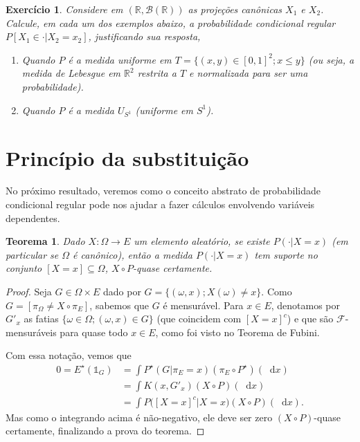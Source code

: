 \documentclass[reqno, final]{book}
\newcommand*\1{\mathds{1}}
\newtheorem{theorem}{Teorema}[section]
\newtheorem{exercise}[example]{Exercício}
\renewcommand*\d{\mathop{}\!\mathrm{d}}
\begin{document}
\begin{exercise}
  Considere em $(\mathbb{R}, \mathcal{B}(\mathbb{R}))$ as projeções canônicas $X_1$ e $X_2$.
  Calcule, em cada um dos exemplos abaixo, a probabilidade condicional regular $P[X_1 \in \cdot|X_2 = x_2]$, justificando sua resposta,
  \begin{enumerate}[\quad a)]
  \item Quando $P$ é a medida uniforme em $T = \{(x,y) \in [0,1]^2; x \leq y\}$ (ou seja, a medida de Lebesgue em $\mathbb{R}^2$ restrita a $T$ e normalizada para ser uma probabilidade).
  \item Quando $P$ é a medida $U_{S^1}$ (uniforme em $S^1$).
  \end{enumerate}
\end{exercise}

\section{Princípio da substituição}

No próximo resultado, veremos como o conceito abstrato de probabilidade condicional regular pode nos ajudar a fazer cálculos envolvendo variáveis dependentes.

\begin{theorem}
  Dado $X: \Omega \to E$ um elemento aleatório, se existe $P(\cdot | X = x)$ (em particular se $\Omega$ é canônico), então a medida $P(\cdot | X = x)$ tem suporte no conjunto $[X = x] \subseteq \Omega$, $X \circ P$-quase certamente.
\end{theorem}

\begin{proof}
  Seja $G \in \Omega \times E$ dado por $G = \{(\omega, x); X(\omega) \neq x\}$.
  Como $G = [\pi_\Omega \neq X \circ \pi_E]$, sabemos que $G$ é mensurável.
  Para $x \in E$, denotamos por $G'_x$ as fatias $\{\omega \in \Omega; (\omega, x) \in G\}$ (que coincidem com $[X = x]^c$) e que são $\mathcal{F}$-mensuráveis para quase todo $x \in E$, como foi visto no Teorema de Fubini.

  Com essa notação, vemos que
  \begin{equation}
    \begin{split}
      0 = E^\star (\1_G) & = \int P^\star(G | \pi_E = x) (\pi_E \circ P^\star) (\d x)\\
      & = \int K(x, G'_x) (X \circ P) (\d x)\\
      & = \int P\big( [X = x]^c | X = x \big) (X \circ P) (\d x).
    \end{split}
  \end{equation}
  Mas como o integrando acima é não-negativo, ele deve ser zero $(X \circ P)$-quase certamente, finalizando a prova do teorema.
\end{proof}
\end{document}
